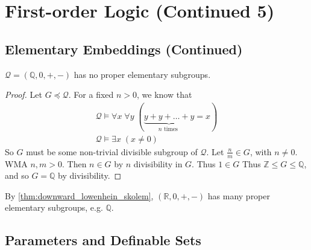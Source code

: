 \documentclass[notoc,notitlepage]{tufte-book}
\begin{document}
\section{First-order Logic (Continued 5)}%
\label{sec:first_order_logic_continued_5}

\subsection{Elementary Embeddings (Continued)}%
\label{sub:elementary_embeddings_continued}

\begin{eg}
  $\mathcal{Q} = (\mathbb{Q}, 0, +, -)$ has no proper elementary subgroups.
\end{eg}

\begin{proof}
  Let $G \preceq \mathcal{Q}$. For a fixed $n > 0$, we know that
  \begin{gather*}
    \mathcal{Q} \models \forall x \; \forall y \; ( \underbrace{y + y + \hdots + y}_{n \text{ times }} = x ) \\
    \mathcal{Q} \models \exists x \; ( x \neq 0 )
  \end{gather*}
  So $G$ must be some non-trivial divisible subgroup of $\mathcal{Q}$. Let $\frac{n}{m} \in G$, with $n \neq 0$. WMA $n, m > 0$. Then $n \in G$ by $n$ divisibility in $G$. Thus $1 \in G$ Thus $\mathbb{Z} \leq G \leq \mathbb{Q}$, and so $G = \mathbb{Q}$ by divisibility.
\end{proof}

\begin{remark}
  By \cref{thm:downward_lowenhein_skolem}, $(\mathbb{R}, 0, +, -)$ has many proper elementary subgroups, e.g. $\mathbb{Q}$.
\end{remark}


\subsection{Parameters and Definable Sets}%
\label{sub:parameters_and_definable_sets}
\end{document}
